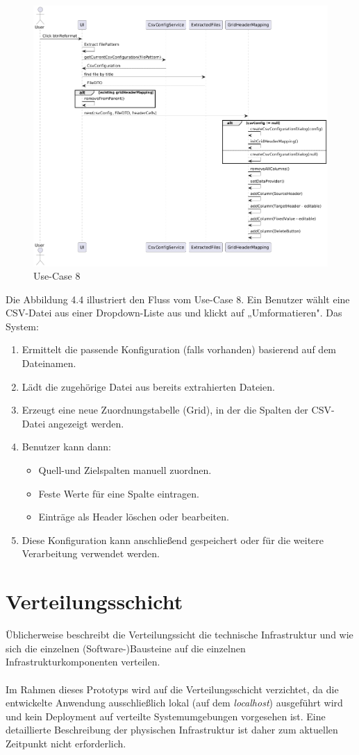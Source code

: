 \documentclass[a4paper,12pt]{scrreprt}
\begin{document}
\begin{figure}[H]
	\includegraphics[width=18.5cm]{CsvKonfiguration.png}
	\caption{\label{} Use-Case 8}
\end{figure}
Die Abbildung 4.4 illustriert den Fluss vom Use-Case 8. Ein Benutzer wählt eine CSV-Datei aus einer Dropdown-Liste aus und klickt auf „Umformatieren". Das System:
\begin{enumerate}
	\item Ermittelt die passende Konfiguration (falls vorhanden) basierend auf dem Dateinamen.
	\item Lädt die zugehörige Datei aus bereits extrahierten Dateien.
	\item Erzeugt eine neue Zuordnungstabelle (Grid), in der die Spalten der CSV-Datei angezeigt werden.
	\item Benutzer kann dann:
		\begin{itemize}
			\item Quell-und Zielspalten manuell zuordnen.
			\item Feste Werte für eine Spalte eintragen.
			\item Einträge als Header löschen oder bearbeiten.
		\end{itemize}
	\item Diese Konfiguration kann anschließend gespeichert oder für die weitere Verarbeitung verwendet werden.
\end{enumerate}
\section*{\large \textbf{Verteilungsschicht}}
Üblicherweise beschreibt die Verteilungssicht die technische Infrastruktur und wie sich die einzelnen (Software-)Bausteine auf die einzelnen Infrastrukturkomponenten verteilen.\\ \\
Im Rahmen dieses Prototyps wird auf die Verteilungsschicht verzichtet, da die entwickelte Anwendung ausschließlich lokal (auf dem \textit{localhost}) ausgeführt wird und kein Deployment auf verteilte Systemumgebungen vorgesehen ist. Eine detaillierte Beschreibung der physischen Infrastruktur ist daher zum aktuellen Zeitpunkt nicht erforderlich.
\end{document}
